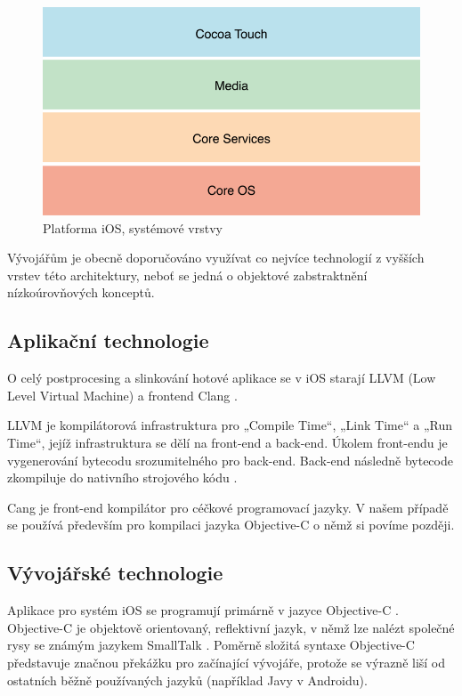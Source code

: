 \begin{figure}\centering
\includegraphics[width=1.0\textwidth]{iOS_SystemLayers.png}
\caption{Platforma iOS, systémové vrstvy \cite{ios_technology_overview}}
\label{fig:iOSSystemLayers}
\end{figure}

Vývojářům je obecně doporučováno využívat co nejvíce technologií z vyšších vrstev této architektury, neboť se jedná o objektové zabstraktnění nízkoúrovňových konceptů.

\subsection{Aplikační technologie}
O celý postprocesing a slinkování hotové aplikace se v iOS starají LLVM (Low Level Virtual Machine) a frontend Clang \cite{bp_dominik}. 

LLVM je kompilátorová infrastruktura pro „Compile Time“, „Link Time“ a „Run Time“, jejíž infrastruktura se dělí na front-end a back-end. Úkolem front-endu je vygenerování bytecodu srozumitelného pro back-end. Back-end následně bytecode zkompiluje do nativního strojového kódu \cite{bp_dominik}. 

Cang je front-end kompilátor pro céčkové programovací jazyky. V našem případě se používá především pro kompilaci jazyka Objective-C o němž si povíme později.

\subsection{Vývojářské technologie}
Aplikace pro systém iOS se programují primárně v jazyce Objective-C \cite{introduction_ios_development}. Objective-C je objektově orientovaný, reflektivní jazyk, v němž lze nalézt společné rysy se známým jazykem SmallTalk \cite{bp_dominik}. Poměrně složitá syntaxe Objective-C představuje značnou překážku pro začínající vývojáře, protože se výrazně liší od ostatních běžně používaných jazyků (například Javy v Androidu).

